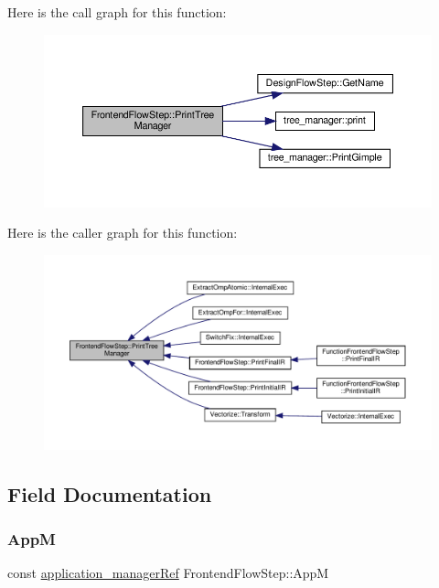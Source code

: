 Here is the call graph for this function\+:
\nopagebreak
\begin{figure}[H]
\begin{center}
\leavevmode
\includegraphics[width=350pt]{d9/d37/classFrontendFlowStep_a2d170a44221abe07d4186a3a00bee56b_cgraph}
\end{center}
\end{figure}
Here is the caller graph for this function\+:
\nopagebreak
\begin{figure}[H]
\begin{center}
\leavevmode
\includegraphics[width=350pt]{d9/d37/classFrontendFlowStep_a2d170a44221abe07d4186a3a00bee56b_icgraph}
\end{center}
\end{figure}


\subsection{Field Documentation}
\mbox{\label{classFrontendFlowStep_a0ac0d8db2a378416583f51c4faa59d15}} 
\subsubsection{\texorpdfstring{AppM}{AppM}}
{\footnotesize\ttfamily const \hyperlink{application__manager_8hpp_a04ccad4e5ee401e8934306672082c180}{application\+\_\+manager\+Ref} Frontend\+Flow\+Step\+::\+AppM\hspace{0.3cm}{\ttfamily [protected]}}



